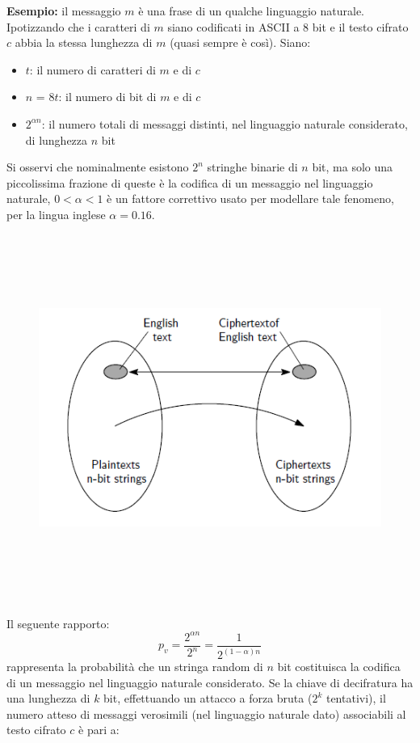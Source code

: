 \textbf{Esempio:} il messaggio $m$ è una frase di un qualche linguaggio naturale. Ipotizzando che i caratteri di $m$ siano codificati in ASCII a 8 bit e il testo cifrato $c$ abbia la stessa lunghezza di $m$ (quasi sempre è così). Siano:
\begin{itemize} 
  \item $t$: il numero di caratteri di $m$ e di $c$
  \item $n$ = $8t$: il numero di bit di $m$ e di $c$
  \item $2^{\alpha n}$: il numero totali di messaggi distinti, nel linguaggio naturale considerato, di lunghezza $n$ bit
\end{itemize}
Si osservi che nominalmente esistono $2^n$ stringhe binarie di $n$ bit, ma solo una piccolissima frazione di queste è la codifica di un messaggio nel linguaggio naturale, $0 < \alpha < 1$ è un fattore correttivo usato per modellare tale fenomeno, per la lingua inglese $\alpha = 0.16$.
\begin{figure}[htbp]
	\centering%
	\subfigure%
	{\includegraphics[height=12cm, width=12cm, keepaspectratio]{Immagini/introduzione/attacco_solo_tc.png}}
\end{figure}
\newline
Il seguente rapporto:
\begin{equation}
p_{v} = \frac{2^{\alpha n}}{2^n} = \frac{1}{2^{(1 - \alpha)n}}
\end{equation}
rappresenta la probabilità che un stringa random di $n$ bit costituisca la codifica di un messaggio nel linguaggio naturale considerato. Se la chiave di decifratura ha una lunghezza di $k$ bit, effettuando un attacco a forza bruta ($2^k$ tentativi), il numero atteso di messaggi verosimili (nel linguaggio naturale dato) associabili al testo cifrato $c$ è pari a:

